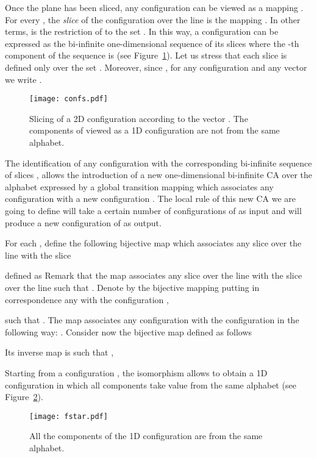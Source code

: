 \documentclass{llncs}
\begin{document}
Once the plane has been sliced, any configuration  can
be viewed as a mapping . For
every , the \emph{slice}  of the configuration 
over the line  is the mapping . In other
terms,  is the restriction of  to the set
. In this way, a configuration  can
be expressed as the bi-infinite one-dimensional sequence  of its
slices  where the -th component of the
sequence  is  (see
Figure~\ref{fig:slicing-conf}). Let us stress that each slice
 is defined only over the set . Moreover, since
, for any
configuration  and any vector  we write .
\begin{figure}[!htb]
  \begin{center}
     \texttt{[image: confs.pdf]}
   \end{center}
   \caption{Slicing of a 2D configuration  according to the vector .
   The components of  viewed as a 1D configuration
   are not from the same alphabet.}
  \label{fig:slicing-conf}
\end{figure}


The identification of any configuration  with the
corresponding bi-infinite sequence of slices ,
allows the introduction of a new one-dimensional bi-infinite CA
over the alphabet  expressed by a global transition mapping
 which associates any
configuration  with a new configuration
. The local rule  of this new CA we are
going to define will take a certain number of configurations of
 as input and will produce a new configuration of  as
output.

For each , define the following bijective map  which associates any slice 
over the line  with the slice 

defined as  Remark that the map
 associates any slice
 over the line  with the slice 
over the line  such that . Denote by
 the bijective mapping putting in
correspondence any  with the configuration
,

such that .
The map  associates any
configuration  with the configuration  in the following way: . Consider now the bijective
map  defined as follows

Its inverse map  is such that
,

Starting from a configuration , the isomorphism  allows
to obtain a 1D configuration  in which all components take
value from the same alphabet (see Figure~\ref{fig:same-alph}).
\begin{figure}[!htb]
  \begin{center}
     \texttt{[image: fstar.pdf]}
   \end{center}
   \caption{All the components of the 1D configuration
    are from the same alphabet.}
 \label{fig:same-alph}
\end{figure}
\end{document}
